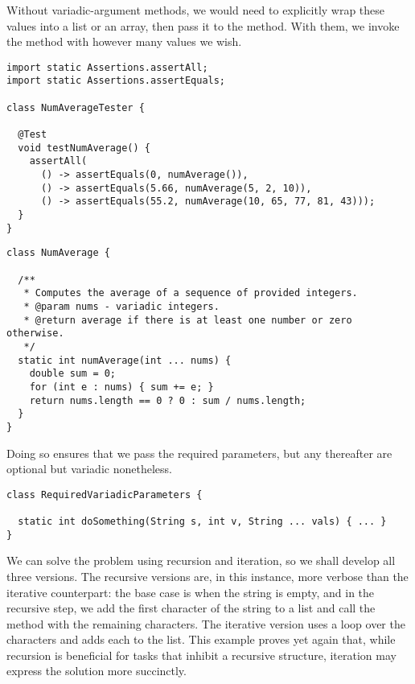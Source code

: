 Without variadic-argument methods, we would need to explicitly wrap these values into a list or an array, then pass it to the method. 
With them, we invoke the method with however many values we wish.

\begin{lstlisting}[language=MyJava]
import static Assertions.assertAll;
import static Assertions.assertEquals;

class NumAverageTester {

  @Test
  void testNumAverage() {
    assertAll(
      () -> assertEquals(0, numAverage()),
      () -> assertEquals(5.66, numAverage(5, 2, 10)),
      () -> assertEquals(55.2, numAverage(10, 65, 77, 81, 43)));
  }
}
\end{lstlisting}

\begin{lstlisting}[language=MyJava]
class NumAverage {

  /**
   * Computes the average of a sequence of provided integers.
   * @param nums - variadic integers.
   * @return average if there is at least one number or zero otherwise.
   */
  static int numAverage(int ... nums) {
    double sum = 0;
    for (int e : nums) { sum += e; }
    return nums.length == 0 ? 0 : sum / nums.length;
  }
}
\end{lstlisting}

Doing so ensures that we pass the required parameters, but any thereafter are optional but variadic nonetheless.

\begin{lstlisting}[language=MyJava]
class RequiredVariadicParameters {

  static int doSomething(String s, int v, String ... vals) { ... }
}
\end{lstlisting}

We can solve the problem using recursion and iteration, so we shall develop all three versions.
The recursive versions are, in this instance, more verbose than the iterative counterpart: the base case is when the string is empty, and in the recursive step, we add the first character of the string to a list and call the method with the remaining characters.
The iterative version uses a loop over the characters and adds each to the list.
This example proves yet again that, while recursion is beneficial for tasks that inhibit a recursive structure, iteration may express the solution more succinctly.

